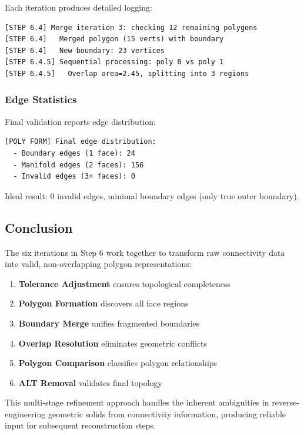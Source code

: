 Each iteration produces detailed logging:

\begin{lstlisting}
[STEP 6.4] Merge iteration 3: checking 12 remaining polygons
[STEP 6.4]   Merged polygon (15 verts) with boundary
[STEP 6.4]   New boundary: 23 vertices
[STEP 6.4.5] Sequential processing: poly 0 vs poly 1
[STEP 6.4.5]   Overlap area=2.45, splitting into 3 regions
\end{lstlisting}

\subsubsection{Edge Statistics}

Final validation reports edge distribution:

\begin{verbatim}
[POLY FORM] Final edge distribution:
  - Boundary edges (1 face): 24
  - Manifold edges (2 faces): 156
  - Invalid edges (3+ faces): 0
\end{verbatim}

Ideal result: 0 invalid edges, minimal boundary edges (only true outer boundary).

\subsection{Conclusion}

The six iterations in Step 6 work together to transform raw connectivity data into valid, non-overlapping polygon representations:

\begin{enumerate}
    \item \textbf{Tolerance Adjustment} ensures topological completeness
    \item \textbf{Polygon Formation} discovers all face regions
    \item \textbf{Boundary Merge} unifies fragmented boundaries
    \item \textbf{Overlap Resolution} eliminates geometric conflicts
    \item \textbf{Polygon Comparison} classifies polygon relationships
    \item \textbf{ALT Removal} validates final topology
\end{enumerate}

This multi-stage refinement approach handles the inherent ambiguities in reverse-engineering geometric solids from connectivity information, producing reliable input for subsequent reconstruction steps.

